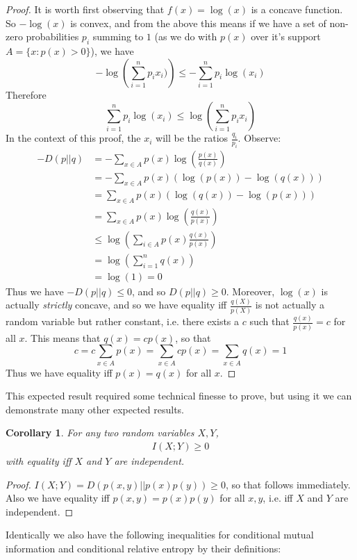 \documentclass{article}
\theoremstyle{definition}
\theoremstyle{plain}
\newtheorem{corollary}{Corollary}[section]
\begin{document}
\begin{proof}
	It is worth first observing that $f(x) = \log(x)$ is a concave function. So $-\log(x)$ is convex, and from the above this means if we have a set of non-zero probabilities $p_i$ summing to $1$ (as we do with $p(x)$ over it's support $A = \{x: p(x) > 0\}$), we have 
	\[ -\log\left(\sum_{i=1}^n p_ix_i) \right) \leq -\sum_{i=1}^n p_i \log(x_i) \]
Therefore 
	\[ \sum_{i=1}^n p_i \log(x_i) \leq \log\left( \sum_{i=1}^n p_ix_i \right) \]
	In the context of this proof, the $x_i$ will be the ratios $\frac{q_i}{p_i}$. Observe:
\begin{align}
	-D(p||q) &= -\sum_{x \in A} p(x)\log\left(\frac{p(x)}{q(x)}\right) \\
		&= -\sum_{x \in A} p(x) (\log(p(x)) - \log(q(x))) \\
		&= \sum_{x \in A} p(x) (\log(q(x)) - \log(p(x))) \\
		&= \sum_{x \in A} p(x) \log\left( \frac{q(x)}{p(x)} \right) \\
		&\leq \log\left( \sum_{i \in A} p(x)\frac{q(x)}{p(x)} \right) \\
		&= \log\left( \sum_{i=1}^n q(x) \right) \\
		&= \log(1) = 0
\end{align}
Thus we have $-D(p||q) \leq 0$, and so $D(p||q) \geq 0$. Moreover, $\log(x)$ is actually \emph{strictly} concave, and so we have equality iff $\frac{q(X)}{p(X)}$ is not actually a random variable but rather constant, i.e. there exists a $c$ such that $\frac{q(x)}{p(x)} = c$ for all $x$. This means that $q(x) = cp(x)$, so that 
\[ c = c\sum_{x \in A}p(x) = \sum_{x \in A} cp(x) = \sum_{x \in A} q(x) = 1 \]
Thus we have equality iff $p(x) = q(x)$ for all $x$. 
\end{proof}
This expected result required some technical finesse to prove, but using it we can demonstrate many other expected results.
\begin{corollary}
	For any two random variables $X,Y$,
	\begin{align}
		I(X;Y) \geq 0
	\end{align}
with equality iff $X$ and $Y$ are independent. 
\end{corollary}
\begin{proof}
	$I(X;Y) = D(p(x,y)||p(x)p(y)) \geq 0$, so that follows immediately. Also we have equality iff $p(x,y) = p(x)p(y)$ for all $x,y$, i.e. iff $X$ and $Y$ are independent.
\end{proof}
Identically we also have the following inequalities for conditional mutual information and conditional relative entropy by their definitions:
\end{document}
